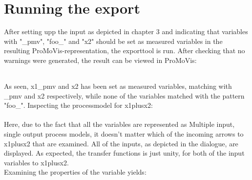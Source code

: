 \section{Running the export}
After setting upp the input as depicted in chapter 3 and indicating that variables with "\_pmv", "foo\_" and "x2" should be set as measured variables in the resulting ProMoVis-representation, the exporttool is run. After checking that no warnings were generated, the result can be viewed in ProMoVis:

\setlength\fboxsep{0pt}
\setlength\fboxrule{0.5pt}
\\\newline
As seen,  x1\_pmv and x2 has been set as measured variables, matching with \_pmv and x2 respectively, while none of the variables matched with the pattern "foo\_". Inspecting the processmodel for x1plusx2:\\\newline
\setlength\fboxsep{0pt}
\setlength\fboxrule{0.5pt}
\\\newline
Here, due to the fact that all the variables are represented as Multiple input, single output process models, it doesn't matter which of the incoming arrows to x1plusx2 that are examined. All of the inputs, as depicted in the dialogue, are displayed. As expected, the transfer functions is just unity, for both of the input variables to x1plusx2. \\\newline
Examining the properties of the variable yields:

